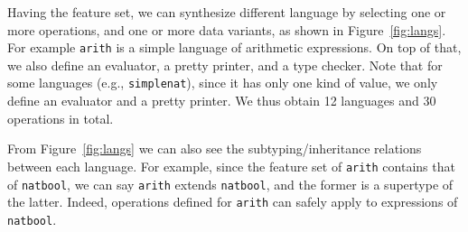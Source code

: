Having the feature set, we can synthesize different language by selecting one or
more operations, and one or more data variants, as shown in
Figure~\ref{fig:langs}. For example \lstinline{arith} is a simple language of
arithmetic expressions. On top of that, we also define an evaluator, a pretty
printer, and a type checker. Note that for some languages (e.g.,
\lstinline{simplenat}), since it has only one kind of value, we only define an
evaluator and a pretty printer. We thus obtain 12 languages and 30 operations in
total.


From Figure~\ref{fig:langs} we can also see the subtyping/inheritance relations
between each language. For example, since the feature set of \lstinline{arith}
contains that of \lstinline{natbool}, we can say \lstinline{arith} extends
\lstinline{natbool}, and the former is a supertype of the latter. Indeed,
operations defined for \lstinline{arith} can safely apply to expressions of \lstinline{natbool}.



